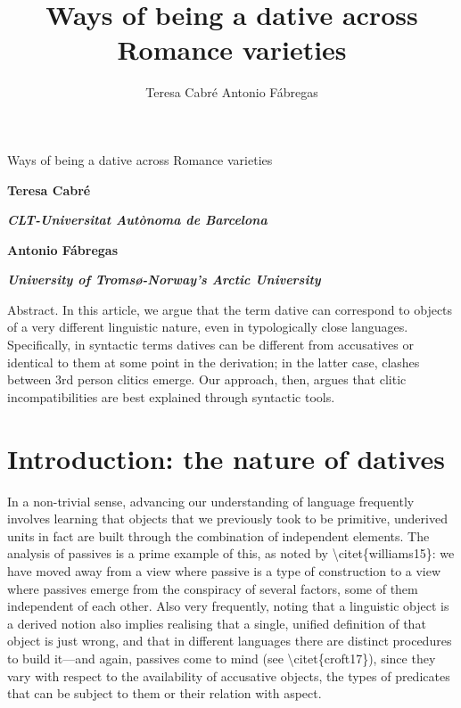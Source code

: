 \documentclass[output=paper,modfonts,nonflat]{langsci/langscibook}
\author{Teresa Cabré\affiliation{}\lastand
Antonio Fábregas\affiliation{}}
\title{Ways of being a dative across Romance varieties}
\begin{document}
\maketitle 


\begin{styleHeading}
Ways of being a dative across Romance varieties
\end{styleHeading}

\sffamily\bfseries
Teresa Cabré

\sffamily\bfseries\itshape
CLT-Universitat Autònoma de Barcelona

\sffamily\bfseries
Antonio Fábregas

\sffamily\bfseries\itshape
University of Tromsø-Norway’s Arctic University

\begin{stylelsAbstract}
Abstract. In this article, we argue that the term dative can correspond to objects of a very different linguistic nature, even in typologically close languages. Specifically, in syntactic terms datives can be different from accusatives or identical to them at some point in the derivation; in the latter case, clashes between 3rd person clitics emerge. Our approach, then, argues that clitic incompatibilities are best explained through syntactic tools.
\end{stylelsAbstract}

\section{Introduction: the nature of datives} %

In a non-trivial sense, advancing our understanding of language frequently involves learning that objects that we previously took to be primitive, underived units in fact are built through the combination of independent elements. The analysis of passives is a prime example of this, as noted by {\textbackslash}citet\{williams15\}: we have moved away from a view where passive is a type of construction to a view where passives emerge from the conspiracy of several factors, some of them independent of each other. Also very frequently, noting that a linguistic object is a derived notion also implies realising that a single, unified definition of that object is just wrong, and that in different languages there are distinct procedures to build it—and again, passives come to mind (see {\textbackslash}citet\{croft17\}), since they vary with respect to the availability of accusative objects, the types of predicates that can be subject to them or their relation with aspect. 
\end{document}

